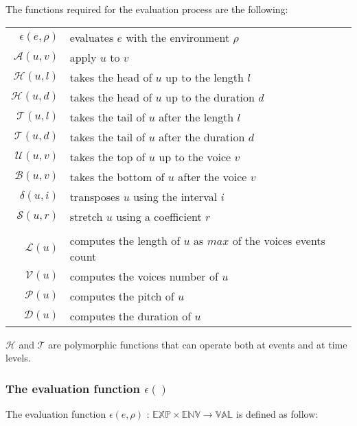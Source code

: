 \documentclass[10pt,a4paper,frenchb]{article}
\newcommand{\expr}{\mathbb{EXP}}
\newcommand{\val}{\mathbb{VAL}}
\newcommand{\env}{\mathbb{ENV}}
\newcommand{\f}[3]{$#1 \times #2 \rightarrow #3$}
\newcommand{\evalsym}{\epsilon}
\newcommand{\eval}[1]{\evalsym(#1,\rho)}
\newcommand{\envsym}{\rho}
\newcommand{\apply}	{{\mathcal A}}
\newcommand{\length}	{{\mathcal L}}
\newcommand{\voices}	{{\mathcal V}}
\newcommand{\pitch}	{{\mathcal P}}
\newcommand{\dur}		{{\mathcal D}}
\newcommand{\head}		{{\mathcal H}}
\newcommand{\tail}		{{\mathcal T}}
\renewcommand{\top}	{{\mathcal U}}
\newcommand{\bottom}	{{\mathcal B}}
\newcommand{\transp}	{\delta}
\renewcommand{\stretch}{{\mathcal S}}
\begin{document}
The functions required for the evaluation process are the following:
\begin{center}
\begin{tabular}{rl}
 \hline
 $\eval{e}$ 			& evaluates $e$ with the environment $\envsym$ \\
 $\apply(u,v)$ 			& apply $u$ to $v$ \\
 $\head(u,l)$ 				& takes the head of $u$ up to the length $l$ \\
 $\head(u,d)$ 				& takes the head of $u$ up to the duration $d$ \\
 $\tail(u,l)$ 				& takes the tail of $u$ after the length $l$ \\
 $\tail(u,d)$ 		  & takes the tail of $u$ after the duration $d$ \\
 $\top(u,v)$ 				& takes the top of $u$ up to the voice $v$ \\
 $\bottom(u,v)$ 			& takes the bottom of $u$ after the voice $v$ \\
 $\transp(u,i)$ 		   & transposes $u$ using the interval $i$ \\
 $\stretch(u,r)$ 		   & stretch $u$ using a coefficient $r$ \\
\multicolumn{2}{c}{\dotfill{}} \\
 $\length(u)$ 				& computes the length of $u$ as $max$ of the voices events count \\
 $\voices(u)$ 				& computes the voices number of $u$ \\
 $\pitch(u)$ 				& computes the pitch of $u$ \\
 $\dur(u)$ 				& computes the duration of $u$ \\
 \hline
\end{tabular}
\end{center}

$\head$ and $\tail$ are polymorphic functions that can operate both at events and at time levels.


\subsubsection{The evaluation function $\evalsym()$}

The evaluation function $\evalsym(e,\envsym)$ : \f{\expr}{\env}{\val} is defined as follow:
\end{document}
